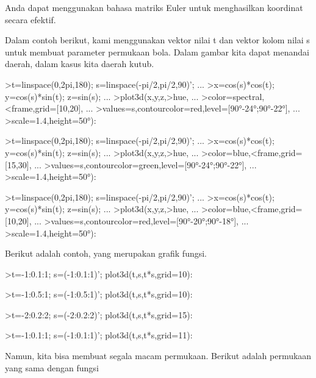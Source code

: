 \documentclass{article}
\begin{document}
\begin{eulernotebook}
\begin{eulercomment}
Anda dapat menggunakan bahasa matriks Euler untuk menghasilkan
koordinat secara efektif.

Dalam contoh berikut, kami menggunakan vektor nilai t dan vektor kolom
nilai s untuk membuat parameter permukaan bola. Dalam gambar kita
dapat menandai daerah, dalam kasus kita daerah kutub.
\end{eulercomment}
\begin{eulerprompt}
>t=linspace(0,2pi,180); s=linspace(-pi/2,pi/2,90)'; ...
>x=cos(s)*cos(t); y=cos(s)*sin(t); z=sin(s); ...
>plot3d(x,y,z,>hue, ...
>color=spectral,<frame,grid=[10,20], ...
>values=s,contourcolor=red,level=[90°-24°;90°-22°], ...
>scale=1.4,height=50°):
\end{eulerprompt}
\begin{eulerprompt}
>t=linspace(0,2pi,180); s=linspace(-pi/2,pi/2,90)'; ...
>x=cos(s)*cos(t); y=cos(s)*sin(t); z=sin(s); ...
>plot3d(x,y,z,>hue, ...
>color=blue,<frame,grid=[15,30], ...
>values=s,contourcolor=green,level=[90°-24°;90°-22°], ...
>scale=1.4,height=50°):
\end{eulerprompt}
\begin{eulerprompt}
>t=linspace(0,2pi,180); s=linspace(-pi/2,pi/2,90)'; ...
>x=cos(s)*cos(t); y=cos(s)*sin(t); z=sin(s); ...
>plot3d(x,y,z,>hue, ...
>color=blue,<frame,grid=[10,20], ...
>values=s,contourcolor=red,level=[90°-20°;90°-18°], ...
>scale=1.4,height=50°):
\end{eulerprompt}
\begin{eulercomment}
Berikut adalah contoh, yang merupakan grafik fungsi.
\end{eulercomment}
\begin{eulerprompt}
>t=-1:0.1:1; s=(-1:0.1:1)'; plot3d(t,s,t*s,grid=10):
\end{eulerprompt}
\begin{eulerprompt}
>t=-1:0.5:1; s=(-1:0.5:1)'; plot3d(t,s,t*s,grid=10):
\end{eulerprompt}
\begin{eulerprompt}
>t=-2:0.2:2; s=(-2:0.2:2)'; plot3d(t,s,t*s,grid=15):
\end{eulerprompt}
\begin{eulerprompt}
>t=-1:0.1:1; s=(-1:0.1:1)'; plot3d(t,s,t*s,grid=11):
\end{eulerprompt}
\begin{eulercomment}
Namun, kita bisa membuat segala macam permukaan. Berikut adalah
permukaan yang sama dengan fungsi


\end{eulercomment}
\end{eulernotebook}
\end{document}
